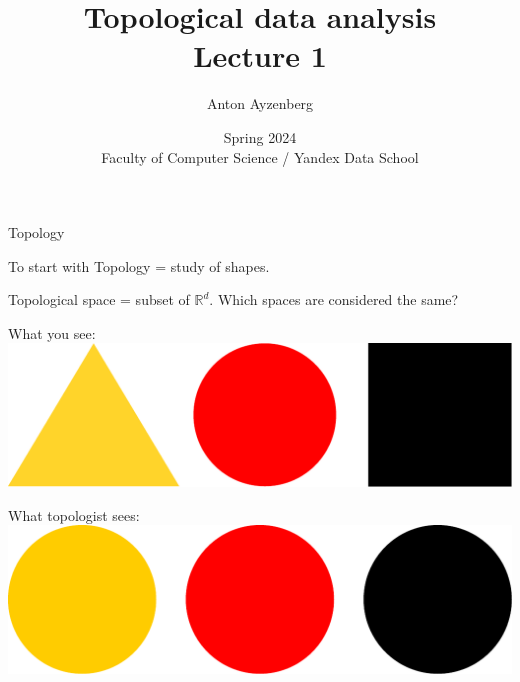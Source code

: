 \documentclass[10pt]{beamer}
\title[Topology intro]{Topological data analysis \\ Lecture 1}
\author[Anton Ayzenberg]{ Anton Ayzenberg }%
\date[FCS-YDS'24]{Spring 2024 \\ Faculty of Computer Science / Yandex Data School}
\institute[ATA \& Noeon Research]{ATA Lab, FCS NRU HSE \\ Noeon Research}
\newcommand{\Ro}{\mathbb{R}}
\begin{document}
\maketitle

\begin{frame}{Topology}

\begin{block}{To start with}
Topology = study of shapes.
\end{block}

Topological space = subset of $\Ro^d$. Which spaces are considered the same?
\pause

\begin{center}
What you see: \includegraphics[scale = 0.2]{pictures/schad2.pdf}
\end{center}

\begin{center}
What topologist sees: \includegraphics[scale = 0.2]{pictures/schad3.pdf}
\end{center}

\end{frame}
\end{document}
